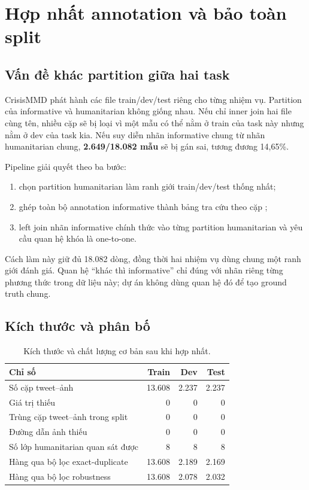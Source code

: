 \section{Hợp nhất annotation và bảo toàn split}

\subsection{Vấn đề khác partition giữa hai task}

CrisisMMD phát hành các file train/dev/test riêng cho từng nhiệm vụ. Partition
của informative và humanitarian không giống nhau. Nếu chỉ inner join hai file
cùng tên, nhiều cặp sẽ bị loại vì một mẫu có thể nằm ở train của task này nhưng
nằm ở dev của task kia. Nếu suy diễn nhãn informative chung từ nhãn
humanitarian chung, \textbf{2.649/18.082 mẫu} sẽ bị gán sai, tương đương
14,65\%.

Pipeline giải quyết theo ba bước:

\begin{enumerate}[leftmargin=*]
  \item chọn partition humanitarian làm ranh giới train/dev/test thống nhất;
  \item ghép toàn bộ annotation informative thành bảng tra cứu theo cặp
        ;
  \item left join nhãn informative chính thức vào từng partition humanitarian
        và yêu cầu quan hệ khóa là one-to-one.
\end{enumerate}

Cách làm này giữ đủ 18.082 dòng, đồng thời hai nhiệm vụ dùng chung một ranh giới
đánh giá. Quan hệ ``khác  thì informative'' chỉ đúng với
nhãn riêng từng phương thức trong dữ liệu này; dự án không dùng quan hệ đó để
tạo ground truth chung.

\subsection{Kích thước và phân bố}

\begin{table}[H]\centering
\caption{Kích thước và chất lượng cơ bản sau khi hợp nhất.}
\begin{tabular}{lrrr}
\toprule
\textbf{Chỉ số} & \textbf{Train} & \textbf{Dev} & \textbf{Test}\\
\midrule
Số cặp tweet--ảnh & 13.608 & 2.237 & 2.237\\
Giá trị thiếu & 0 & 0 & 0\\
Trùng cặp tweet--ảnh trong split & 0 & 0 & 0\\
Đường dẫn ảnh thiếu & 0 & 0 & 0\\
Số lớp humanitarian quan sát được & 8 & 8 & 8\\
Hàng qua bộ lọc exact-duplicate & 13.608 & 2.189 & 2.169\\
Hàng qua bộ lọc robustness & 13.608 & 2.078 & 2.032\\
\bottomrule
\end{tabular}
\end{table}


